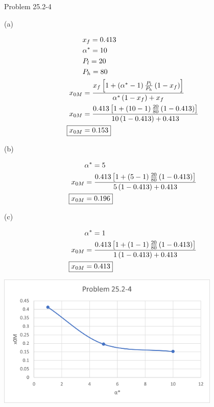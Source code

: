 \item Problem 25.2-4

(a)

\begin{align*}
    & x_f = 0.413 \\
    & \alpha^* = 10 \\
    & P_l = 20 \\
    & P_h = 80 \\
    x_{0M} &= \frac{x_f \left[1 + \left(\alpha^*-1\right)\frac{P_l}{P_h}\left(1-x_f\right)\right]}{\alpha^*\left(1-x_f\right)+x_f} \\
    x_{0M} &= \frac{0.413 \left[1 + \left(10-1\right)\frac{20}{80}\left(1-0.413\right)\right]}{10\left(1-0.413\right)+0.413} \\
    \Aboxed{x_{0M} &= 0.153}
\end{align*}

(b)

\begin{align*}
    & \alpha^* = 5 \\
    x_{0M} &= \frac{0.413 \left[1 + \left(5-1\right)\frac{20}{80}\left(1-0.413\right)\right]}{5\left(1-0.413\right)+0.413} \\
    \Aboxed{x_{0M} &= 0.196}
\end{align*}

(c)

\begin{align*}
    & \alpha^* = 1 \\
    x_{0M} &= \frac{0.413 \left[1 + \left(1-1\right)\frac{20}{80}\left(1-0.413\right)\right]}{1\left(1-0.413\right)+0.413} \\
    \Aboxed{x_{0M} &= 0.413}
\end{align*}

\begin{center}
    \includegraphics[width=0.8\textwidth]{assets/p3.png}
\end{center}